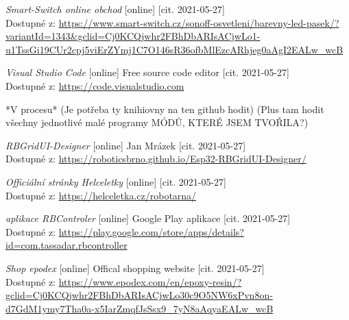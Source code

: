 \begin{thebibliography}{99}
\textit{Smart-Switch online obchod} [online]  [cit. 2021-05-27] \\
Dostupné z: \url{https://www.smart-switch.cz/sonoff-osvetleni/barevny-led-pasek/?variantId=1343&gclid=Cj0KCQjwhr2FBhDbARIsACjwLo1-u1TssGi19CUr2cpj5viErZYmj1C7O146sR36ofbMlEzcARhjeg0aAgI2EALw_wcB}

\textit{Visual Studio Code} [online] Free source code editor [cit. 2021-05-27] \\
Dostupné z: \url{https://code.visualstudio.com} 

*V procesu* (Je potřeba ty knihiovny na ten github hodit)
(Plus tam hodit všechny jednotlivé malé programy MÓDŮ, KTERÉ JSEM TVOŘILA?)

\textit{RBGridUI-Designer} [online] Jan Mrázek [cit. 2021-05-27] \\
Dostupné z: \url{https://roboticsbrno.github.io/Esp32-RBGridUI-Designer/} 

\textit{Officiální stránky Helceletky} [online]  [cit. 2021-05-27] \\
Dostupné z: \url{https://helceletka.cz/robotarna/}

\textit{aplikace RBControler} [online] Google Play aplikace [cit. 2021-05-27] \\
Dostupné z: \url{https://play.google.com/store/apps/details?id=com.tassadar.rbcontroller}

\textit{Shop epodex} [online] Offical shopping website [cit. 2021-05-27] \\
Dostupné z: \url{https://www.epodex.com/en/epoxy-resin/?gclid=Cj0KCQjwhr2FBhDbARIsACjwLo30c9O5NW6xPvn8on-d7GdM1ymy7Tha0a-x5IarZmqfJsSsx9_7yN8aAqyaEALw_wcB}

\end{thebibliography}
